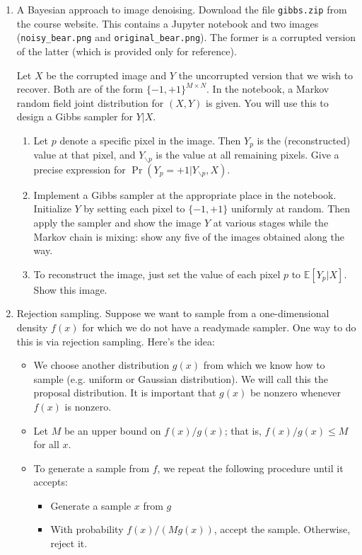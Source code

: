 \documentclass[11pt]{article}
\begin{document}
\begin{enumerate}
\begin{enumerate}
\item Now show how $P$ factors over $G$ by explicitly giving the three (conditional) probability tables, one per $x_i$.

\item Draw the minimal undirected graph $G'$ over which distribution $P$ factors.
\end{enumerate}

\item A Bayesian approach to image denoising. Download the file \texttt{gibbs.zip} from the course website. This contains a Jupyter notebook and two images (\texttt{noisy\_bear.png} and \texttt{original\_bear.png}). The former is a corrupted version of the latter (which is provided only for reference).

Let $X$ be the corrupted image and $Y$ the uncorrupted version that we wish to recover. Both are of the form $\{-1, +1\}^{M \times N}$. In the notebook, a Markov random field joint distribution for $(X, Y)$ is given. You will use this to design a Gibbs sampler for $Y|X$.

\begin{enumerate}
\item Let $p$ denote a specific pixel in the image. Then $Y_p$ is the (reconstructed) value at that pixel, and $Y_{\backslash p}$ is the value at all remaining pixels. Give a precise expression for $\Pr(Y_p = +1|Y_{\backslash p}, X)$.

\item Implement a Gibbs sampler at the appropriate place in the notebook. Initialize $Y$ by setting each pixel to $\{-1, +1\}$ uniformly at random. Then apply the sampler and show the image $Y$ at various stages while the Markov chain is mixing: show any five of the images obtained along the way.

\item To reconstruct the image, just set the value of each pixel $p$ to $\mathbb{E}[Y_p|X]$. Show this image.
\end{enumerate}

\item Rejection sampling. Suppose we want to sample from a one-dimensional density $f(x)$ for which we do not have a readymade sampler. One way to do this is via rejection sampling. Here's the idea:
\begin{itemize}
\item We choose another distribution $g(x)$ from which we know how to sample (e.g. uniform or Gaussian distribution). We will call this the proposal distribution. It is important that $g(x)$ be nonzero whenever $f(x)$ is nonzero.
\item Let $M$ be an upper bound on $f(x)/g(x)$; that is, $f(x)/g(x) \leq M$ for all $x$.
\item To generate a sample from $f$, we repeat the following procedure until it accepts:
\begin{itemize}
\item Generate a sample $x$ from $g$
\item With probability $f(x)/(Mg(x))$, accept the sample. Otherwise, reject it.
\end{itemize}
\end{itemize}


\end{enumerate}
\end{document}
